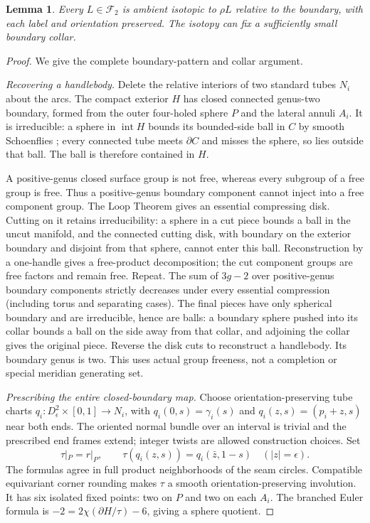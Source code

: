 \documentclass[11pt]{article}
\newtheorem{lemma}[theorem]{Lemma}
\theoremstyle{remark}\newtheorem{remark}[theorem]{Remark}
\newcommand{\F}{\mathcal F}
\newcommand{\Int}{\operatorname{int}}
\begin{document}
\begin{lemma}\label{lem:reversal}
Every $L\in\F_2$ is ambient isotopic to $\rho L$ relative to the boundary,
with each label and orientation preserved. The isotopy can fix a sufficiently
small boundary collar.
\end{lemma}
\begin{proof}
We give the complete boundary-pattern and collar argument.

\emph{Recovering a handlebody.}
Delete the relative interiors of two standard tubes $N_i$ about the arcs.
The compact exterior $H$ has closed connected genus-two boundary, formed
from the outer four-holed sphere $P$ and the lateral annuli $A_i$.
It is irreducible: a sphere in $\Int H$ bounds its bounded-side ball in $C$
by smooth Schoenflies \cite[Theorem 1.1]{Hatcher3M}; every connected tube
meets $\partial C$ and misses the sphere, so lies outside that ball.
The ball is therefore contained in $H$.

A positive-genus closed surface group is not free, whereas every subgroup
of a free group is free. Thus a positive-genus boundary component cannot
inject into a free component group. The Loop Theorem
\cite[Theorem 3.1]{Hatcher3M} gives an essential compressing disk.
Cutting on it retains irreducibility: a sphere in a cut piece bounds a
ball in the uncut manifold, and the connected cutting disk, with boundary
on the exterior boundary and disjoint from that sphere, cannot enter this
ball. Reconstruction by a one-handle gives a free-product decomposition;
the cut component groups are free factors and remain free. Repeat.
The sum of $3g-2$ over positive-genus boundary components strictly decreases
under every essential compression (including torus and separating cases).
The final pieces have only spherical boundary and are irreducible, hence
are balls: a boundary sphere pushed into its collar bounds a ball on the
side away from that collar, and adjoining the collar gives the original
piece. Reverse the disk cuts to reconstruct a handlebody. Its boundary
genus is two. This uses actual group freeness, not a completion or special
meridian generating set.

\emph{Prescribing the entire closed-boundary map.}
Choose orientation-preserving tube charts
$q_i:D^2_\epsilon\times[0,1]\to N_i$, with
$q_i(0,s)=\gamma_i(s)$ and $q_i(z,s)=(p_i+z,s)$ near both ends.
The oriented normal bundle over an interval is trivial and the prescribed
end frames extend; integer twists are allowed construction choices.
Set
\begin{equation}\label{eq:tau}
\tau|_P=r|_P,\qquad
\tau(q_i(z,s))=q_i(\bar z,1-s)\quad(|z|=\epsilon).
\end{equation}
The formulas agree in full product neighborhoods of the seam circles.
Compatible equivariant corner rounding makes $\tau$ a smooth
orientation-preserving involution. It has six isolated fixed points:
two on $P$ and two on each $A_i$. The branched Euler formula is
$-2=2\chi(\partial H/\tau)-6$, giving a sphere quotient.


\end{proof}
\end{document}
